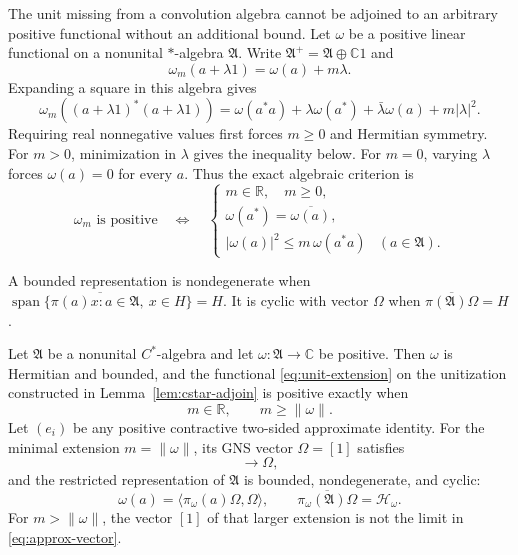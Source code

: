 \documentclass[11pt]{article}
\numberwithin{equation}{section}
\newcommand{\R}{\mathbb R}
\newcommand{\C}{\mathbb C}
\begin{document}
The unit missing from a convolution algebra cannot be adjoined to an
arbitrary positive functional without an additional bound.  Let $\omega$
be a positive linear functional on a nonunital $*$-algebra $\mathfrak A$.
Write
$\mathfrak A^+=\mathfrak A\oplus\C1$ and
\begin{equation}
 \omega_m(a+\lambda1)=\omega(a)+m\lambda.
 \label{eq:unit-extension}
\end{equation}
Expanding a square in this algebra gives
\[
 \omega_m((a+\lambda1)^*(a+\lambda1))
 =\omega(a^*a)+\lambda\omega(a^*)+\bar\lambda\omega(a)+m|\lambda|^2.
\]
Requiring real nonnegative values first forces $m\geq0$ and Hermitian
symmetry.  For $m>0$, minimization in $\lambda$ gives the inequality below.
For $m=0$, varying $\lambda$ forces $\omega(a)=0$ for every $a$.
Thus the exact algebraic criterion is
\begin{equation}
 \omega_m\text{ is positive}
 \quad\Longleftrightarrow\quad
 \begin{cases}
 m\in\R,\quad m\geq0,\\
 \omega(a^*)=\overline{\omega(a)},\\
 |\omega(a)|^2\leq m\,\omega(a^*a)&(a\in\mathfrak A).
 \end{cases}
 \label{eq:unit-criterion}
\end{equation}

A bounded representation is nondegenerate when
$\overline{\operatorname{span}\{\pi(a)x:a\in\mathfrak A,\ x\in H\}}=H$.
It is cyclic with vector $\Omega$ when
$\overline{\pi(\mathfrak A)\Omega}=H$.

\begin{theorem}
Let\label{thm:cstar-unitization} $\mathfrak A$ be a nonunital $C^*$-algebra and let
$\omega:\mathfrak A\to\C$ be positive.  Then $\omega$ is Hermitian and
bounded, and the functional \eqref{eq:unit-extension} on the unitization
constructed in Lemma~\ref{lem:cstar-adjoin} is positive exactly when
\begin{equation}
 m\in\R,\qquad m\geq\|\omega\|.
 \label{eq:minimal-mass}
\end{equation}
Let $(e_i)$ be any positive contractive two-sided approximate identity.
For the minimal extension $m=\|\omega\|$, its GNS vector
$\Omega=[1]$ satisfies
\begin{equation}
 [e_i]\longrightarrow\Omega,
 \label{eq:approx-vector}
\end{equation}
and the restricted representation of $\mathfrak A$ is bounded,
nondegenerate, and cyclic:
\begin{equation}
 \omega(a)=\langle\pi_\omega(a)\Omega,\Omega\rangle,
 \qquad
 \overline{\pi_\omega(\mathfrak A)\Omega}=\mathcal H_\omega.
 \label{eq:cyclic-vector}
\end{equation}
For $m>\|\omega\|$, the vector $[1]$ of that larger extension is not the
limit in \eqref{eq:approx-vector}.
\end{theorem}
\end{document}
